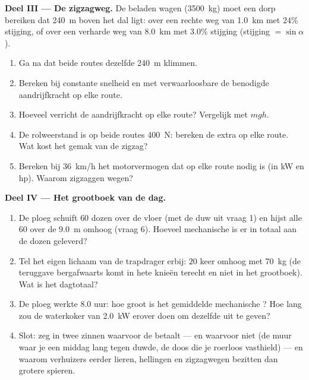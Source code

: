 \begin{problem}
\medskip
\noindent\textbf{Deel III --- De zigzagweg.}
De beladen wagen (\qty{3500}{kg}) moet een dorp bereiken dat \qty{240}{m}
boven het dal ligt: over een rechte weg van \qty{1.0}{km} met $24\%$
stijging, of over een verharde weg van \qty{8.0}{km} met $3.0\%$
stijging (stijging $= \sin\alpha$).
\begin{enumerate}[resume]
  \item Ga na dat beide routes dezelfde \qty{240}{m} klimmen.
  \item Bereken bij constante snelheid en met verwaarloosbare  de
        benodigde aandrijfkracht op elke route.
  \item Hoeveel  verricht de aandrijfkracht op elke route?
        Vergelijk met $mgh$.
  \item De rolweerstand is op beide routes \qty{400}{N}: bereken de extra
         op elke route. Wat kost het gemak van de zigzag?
  \item Bereken bij \qty{36}{km/h} het motorvermogen dat op elke route
        nodig is (in \unit{kW} en \unit{hp}). Waarom zigzaggen wegen?
\end{enumerate}

\medskip
\noindent\textbf{Deel IV --- Het grootboek van de dag.}
\begin{enumerate}[resume]
  \item De ploeg schuift $60$ dozen over de vloer (met de duw uit vraag
        1) en hijst alle $60$ over de \qty{9.0}{m} omhoog (vraag 6).
        Hoeveel mechanische  is er in totaal aan de dozen
        geleverd?
  \item Tel het eigen lichaam van de trapdrager erbij: $20$ keer omhoog
        met \qty{70}{kg} (de teruggave bergafwaarts komt in hete knieën
        terecht en niet in het grootboek). Wat is het dagtotaal?
  \item De ploeg werkte $8.0$ uur: hoe groot is het gemiddelde
        mechanische ? Hoe lang zou de waterkoker van \qty{2.0}{kW}
        erover doen om dezelfde  uit te geven?
  \item Slot: zeg in twee zinnen waarvoor de  betaalt --- en
        waarvoor niet (de muur waar je een middag lang tegen duwde, de
        doos die je roerloos vasthield) --- en waarom verhuizers eerder
        lieren, hellingen en zigzagwegen bezitten dan grotere spieren.
\end{enumerate}
\end{problem}
